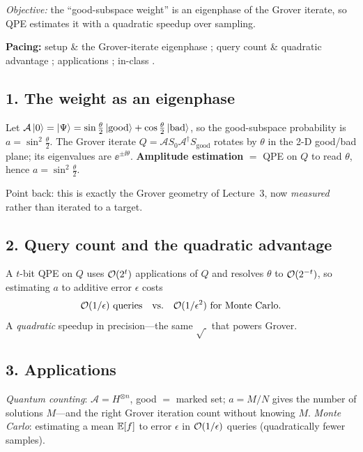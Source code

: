 \documentclass[11pt]{article}
\begin{document}
\noindent\emph{Objective:} the ``good-subspace weight'' is an eigenphase of the Grover
iterate, so QPE estimates it with a quadratic speedup over sampling.

\medskip
\noindent\textbf{Pacing:} setup \& the Grover-iterate eigenphase ; query count
\& quadratic advantage ; applications ; in-class .

\subsection*{1. The weight as an eigenphase }
\begin{board}
Let $\mathcal A\ket0=\ket\Psi=\sin\tfrac\theta2\ket{\text{good}}+\cos\tfrac\theta2\ket{\text{bad}}$,
so the good-subspace probability is $a=\sin^2\tfrac\theta2$. The Grover iterate
$Q=\mathcal A S_0\mathcal A^\dagger S_{\text{good}}$ rotates by $\theta$ in the 2-D
good/bad plane; its eigenvalues are $\ee^{\pm\ii\theta}$. \textbf{Amplitude estimation}
$=$ QPE on $Q$ to read $\theta$, hence $a=\sin^2\tfrac\theta2$.
\end{board}
Point back: this is exactly the Grover geometry of Lecture~3, now \emph{measured} rather
than iterated to a target.

\subsection*{2. Query count and the quadratic advantage }
\begin{board}
A $t$-bit QPE on $Q$ uses $\mathcal{O}(2^t)$ applications of $Q$ and resolves $\theta$ to
$\mathcal{O}(2^{-t})$, so estimating $a$ to additive error $\epsilon$ costs
\[
  \bigo(1/\epsilon)\ \text{queries}\quad\text{vs.}\quad\bigo(1/\epsilon^2)\ \text{for Monte Carlo.}
\]
A \emph{quadratic} speedup in precision---the same $\sqrt{\ }$ that powers Grover.
\end{board}

\subsection*{3. Applications }
\begin{board}
\emph{Quantum counting}: $\mathcal A=H^{\otimes n}$, good $=$ marked set; $a=M/N$ gives the
number of solutions $M$---and the right Grover iteration count without knowing $M$.
\emph{Monte Carlo}: estimating a mean $\mathbb{E}[f]$ to error $\epsilon$ in $\mathcal{O}(1/\epsilon)$
queries (quadratically fewer samples).
\end{board}
\end{document}
